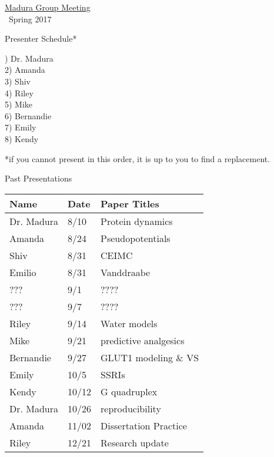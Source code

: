 \documentclass{article}
\begin{document}
\begin{center}
\Large{\underline{Madura Group Meeting}}\\
\
\small{Spring 2017}
\end{center}
\begin{center}
Presenter Schedule*

\end{center}

) Dr. Madura \\
2) Amanda \\
3) Shiv\\
4) Riley\\
5) Mike\\
6) Bernandie\\
7) Emily\\
8) Kendy\\

\vspace{0.5cm}

*if you cannot present in this order, it is up to you to find a replacement.
\vspace{1cm}
\begin{center}
Past Presentations

\end{center}
\vspace{.6cm}

\begin{tabularx}{\textwidth}{XXX}
Name \hfill &Date \hfill&Paper Titles \hfill\\ \toprule
Dr. Madura  &8/10 &Protein dynamics \\
Amanda  &8/24 &Pseudopotentials\\
Shiv &8/31 &CEIMC\\
Emilio &8/31 &Vanddraabe\\
??? &9/1 &????\\
??? &9/7 &????\\
Riley &9/14 &Water models\\
Mike &9/21 &predictive analgesics \\
Bernandie &9/27 &GLUT1 modeling \& VS \\
Emily & 10/5 & SSRIs\\
Kendy & 10/12 & G quadruplex\\
Dr. Madura & 10/26 & reproducibility\\
Amanda & 11/02 & Dissertation Practice\\
Riley & 12/21& Research update \\\bottomrule
\end{tabularx}
\end{document}
